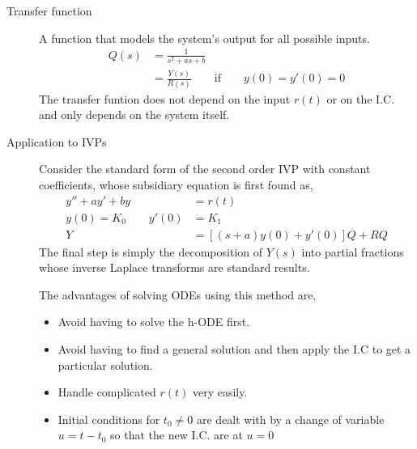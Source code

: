 \begin{description}
    \item[Transfer function] A function that models the system's output for all possible
        inputs.
        \begin{align}
            Q(s) & = \frac{1}{s^2 + as + b}                    \\
                 & = \frac{Y(s)}{R(s)} \qquad \text{if} \qquad
            y(0) = y'(0) = 0
        \end{align}
        The transfer funtion does not depend on the input $ r(t) $ or on the I.C.
        and only depends on the system itself.

    \item[Application to IVPs] Consider the standard form of the second order IVP with
        constant coefficients, whose subsidiary equation is first found as,
        \begin{align}
            y'' + ay' + by          & = r(t)                      \\
            y(0) = K_0 \qquad y'(0) & = K_1                       \\
            Y                       & = [(s+a)y(0) + y'(0)]Q + RQ
        \end{align}
        The final step is simply the decomposition of $ Y(s) $ into partial fractions
        whose inverse Laplace transforms are standard results. \par
        The advantages of solving ODEs using this method are,
        \begin{itemize}
            \item Avoid having to solve the h-ODE first.
            \item Avoid having to find a general solution and then apply the I.C to
                  get a particular solution.
            \item Handle complicated $ r(t) $ very easily.
            \item Initial conditions for $ t_0 \neq 0 $ are dealt with by a change of
                  variable $ u = t - t_0 $ so that the new I.C. are at $ u = 0 $
        \end{itemize}

\end{description}

